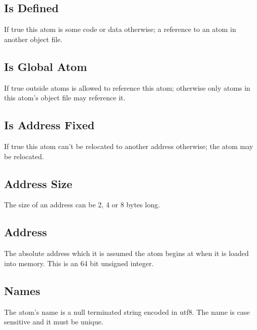 \subsection{Is Defined}
If true this atom is some code or data otherwise; a reference to an atom in 
another object file.

\subsection{Is Global Atom}
If true outside atoms is allowed to reference this atom; otherwise only atoms in
this atom's object file may reference it.

\subsection{Is Address Fixed}
If true this atom can't be relocated to another address otherwise; the atom may
be relocated.

\subsection{Address Size}
The size of an address can be 2, 4 or 8 bytes long.

\subsection{Address}
The absolute address which it is assumed the atom begins at when it is loaded
into memory. This is an 64 bit unsigned integer.

\subsection{Names}
The atom's name is a null terminated string encoded in utf8. The name is case 
sensitive and it must be unique.